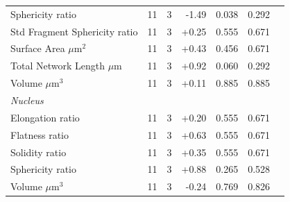 \documentclass[11pt,a4paper]{article}
\begin{document}
\begin{longtable}{lrrrrrr}
  Sphericity ratio & 11 & 3 & -1.49 & 0.038 & 0.292 &  \\
  Std Fragment Sphericity ratio & 11 & 3 & +0.25 & 0.555 & 0.671 &  \\
  Surface Area $\mu$m$^{2}$ & 11 & 3 & +0.43 & 0.456 & 0.671 &  \\
  Total Network Length $\mu$m & 11 & 3 & +0.92 & 0.060 & 0.292 &  \\
  Volume $\mu$m$^{3}$ & 11 & 3 & +0.11 & 0.885 & 0.885 &  \\
\midrule
\multicolumn{7}{l}{\textit{Nucleus}} \\
  Elongation ratio & 11 & 3 & +0.20 & 0.555 & 0.671 &  \\
  Flatness ratio & 11 & 3 & +0.63 & 0.555 & 0.671 &  \\
  Solidity ratio & 11 & 3 & +0.35 & 0.555 & 0.671 &  \\
  Sphericity ratio & 11 & 3 & +0.88 & 0.265 & 0.528 &  \\
  Volume $\mu$m$^{3}$ & 11 & 3 & -0.24 & 0.769 & 0.826 &  \\
\bottomrule
\end{longtable}
\end{document}
